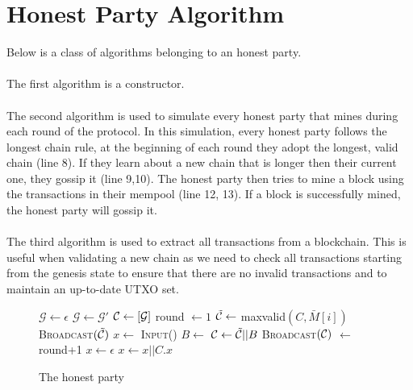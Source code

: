 \section{Honest Party Algorithm}
Below is a class of algorithms belonging to an honest party.
\\
\\
The first algorithm is a constructor.
\\
\\
The second algorithm is used to simulate every honest party that mines during each round of the protocol. In this simulation, every honest party follows the longest chain rule, at the beginning of each round they adopt the longest, valid chain (line 8). If they learn about a new chain that is longer then their current one, they gossip it (line 9,10). The honest party then tries to mine a block using the transactions in their mempool (line 12, 13). If a block is successfully mined, the honest party will gossip it.
\\
\\
The third algorithm is used to extract all transactions from a blockchain. This is useful when validating a new chain as we need to check all transactions starting from the genesis state to ensure that there are no invalid transactions and to maintain an up-to-date UTXO set.
\begin{figure}[H]
\begin{algorithm}[H]
    \caption{\label{alg.backbone} The honest party}
    \begin{algorithmic}[1]
     \Statex
     \State $\mathcal{G} \leftarrow \epsilon$
            \State $\mathcal{G} \leftarrow \mathcal{G}'$ 
            \State $\mathcal{C} \leftarrow [\mathcal{G}]$ 
            \State \textsf{round} $\leftarrow 1$
        \EndFunction
            \State $\tilde{\mathcal{C}} \leftarrow$ maxvalid$(C, \bar M[i])$ 
            \If{$\tilde\chain \neq \chain$}
                \State\textsc{Broadcast}{$(\tilde{\mathcal{C}})$} 
            \EndIf
            \State $x \leftarrow$ {\textsc{Input}()} 
            \State $B \leftarrow$ {}
             
                \State $\mathcal{C} \leftarrow \tilde{\mathcal{C}} || B$ 
                \State\textsc{Broadcast}{$(\mathcal{C})$} 
            \EndIf
             $\leftarrow$ {\textsf{round}+1}
        \EndFunction
            \State $x \leftarrow \epsilon$ 
                \State $x \leftarrow x || C.x$ 
            \EndFor
            \State{}
        \EndFunction
        \vskip8pt
    \end{algorithmic}
\end{algorithm}
\end{figure}

